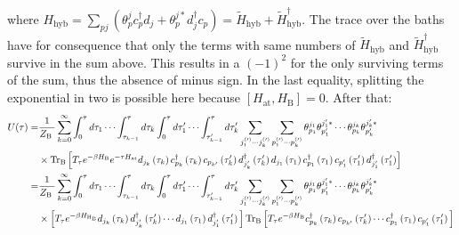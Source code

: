 \documentclass[10pt,letter]{article}
\begin{document}
where
$H_{\mathrm{hyb}}=\sum_{p j}\left(\theta_{p}^{j} c_{p}^{\dagger} d_{j}+\theta_{p}^{j *} d_{j}^{\dagger} c_{p}\right)=\tilde{H}_{\mathrm{hyb}}+\tilde{H}_{\mathrm{hyb}}^{\dagger}$. The trace over the baths have for consequence that only the terms with same numbers of $\tilde{H}_{\mathrm{hyb}}$ and $\tilde{H}_{\mathrm{hyb}}^{\dagger}$ survive in the sum above. This results in a $(-1)^2$ for the only surviving terms of the sum, thus the absence of minus sign. In the last equality, splitting the exponential in two is possible here because $[H_{\mathrm{at}},H_{\mathrm{B}}]=0$.
After that: 
\begin{align}
U(\tau)=& \frac{1}{Z_{\text {B }}}\sum_{k=0}^{\infty}   \int_{0}^{\tau} d \tau_{1} \cdots \int_{\tau_{k-1}}^{\tau} d \tau_{k} \int_{0}^{\tau} d \tau_{1}^{\prime} \cdots \int_{\tau_{k-1}^{\prime}}^{\tau} d \tau_{k}^{\prime} 
\sum_{j_1^{(\prime)} \cdots j_k^{(\prime)}} \sum_{p_1^{(\prime)} \cdots  p_k^{(\prime)}} 
\theta_{p_{1}}^{j_{1}} \theta_{p_{1}^{\prime}}^{j_{1}^{\prime}*} \cdots \theta_{p_{k}}^{j_{k}} \theta_{p_{k}^{\prime}}^{j_k^{\prime}*} 
\nonumber
\\
& \times \operatorname{Tr_B}\left[T_{\tau} e^{-\beta H_\mathrm{B}} e^{-\tau H_{\mathrm{at}}} d_{j_{k}}\left(\tau_{k}\right) c_{p_{k}}^{\dagger}\left(\tau_{k}\right) c_{p_{k^{\prime}}}\left(\tau_{k}^{\prime}\right)   d_{j_{k}^{\prime}}^{\dagger}\left(\tau_{k}^{\prime}\right)
d_{j_{1}}\left(\tau_{1}\right) c_{p_{1}}^{\dagger}\left(\tau_{1}\right) c_{p_{1}^{\prime}}\left(\tau_{1}^{\prime}\right) d_{j_{1}^{\prime}}^{\dagger}\left(\tau_{1}^{\prime}\right)\right]
\\
=& \frac{1}{Z_{\text {B }}}\sum_{k=0}^{\infty}  \int_{0}^{\tau} d \tau_{1} \cdots \int_{\tau_{k-1}}^{\tau} d \tau_{k} \int_{0}^{\tau} d \tau_{1}^{\prime} \cdots \int_{\tau_{k-1}^{\prime}}^{\tau} d \tau_{k}^{\prime}
\sum_{j_1^{(\prime)} \cdots j_k^{(\prime)}} \sum_{p_1^{(\prime)} \cdots  p_k^{(\prime)}} 
\theta_{p_{1}}^{j_{1}} \theta_{p_{1}^{\prime}}^{j_{1}^{\prime}*} \cdots \theta_{p_{k}}^{j_{k}} \theta_{p_{k}^{\prime}}^{j_k^{\prime}*} 
\nonumber
\\
& \times \Big[T_{\tau} e^{-\beta H_{\mathrm{H_\mathrm{B}}}} d_{j_{k}}\left(\tau_{k}\right) d_{j_{k}^{\prime}}^{\dagger}\left(\tau_{k}^{\prime}\right) \cdots d_{j_{1}}\left(\tau_{1}\right) d_{j_{1}^{\prime}}^{\dagger}\left(\tau_{1}^{\prime}\right)\Big]
\operatorname{Tr_B}
\Big[ T_{\tau} e^{-\beta H_{\mathrm{B}}} c_{p_{k}}^{\dagger}\left(\tau_{k}\right) c_{p_{k^{\prime}}}\left(\tau_{k}^{\prime}\right) \cdots c_{p_{1}}^{\dagger}\left(\tau_{1}\right) c_{p_{1}^{\prime}}\left(\tau_{1}^{\prime}\right)\Big]
\label{eq::u2}
\end{align}
\end{document}
